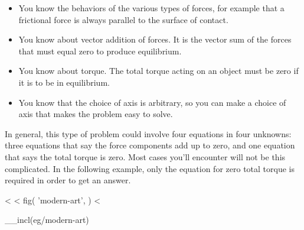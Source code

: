 \begin{itemize}

\item You know the behaviors of the various types of forces, for
example that a frictional force is always parallel to
the surface of contact.

\item You know about vector addition of forces. It is the vector
sum of the forces that must equal zero to produce equilibrium.

\item You know about torque. The total torque acting on an
object must be zero if it is to be in equilibrium.

\item You know that the choice of axis is arbitrary, so you can
make a choice of axis that makes the problem easy to solve.

\end{itemize}

\noindent In general, this type of problem could involve four
equations in four unknowns: three equations that say the
force components add up to zero, and one equation that says
the total torque is zero. Most cases you'll encounter will
not be this complicated. In the following example, only the
equation for zero total torque is required in order to get an answer.

\vfill\pagebreak[4]

<%
<%
  fig(
    'modern-art',
  )
<%

__incl(eg/modern-art)

